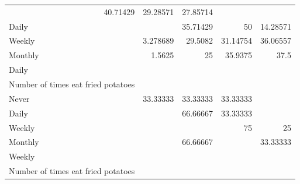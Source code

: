 \documentclass{article}
\begin{document}
\begin{table}[!h]
{\begin{tabular}{lllll}
			\multicolumn{1}{r}{40.71429} &
			\multicolumn{1}{r}{29.28571} &
			\multicolumn{1}{r}{27.85714} \\
			\multicolumn{1}{l}{\hspace{5em}Daily} &
			\multicolumn{1}{|r}{} &
			\multicolumn{1}{r}{35.71429} &
			\multicolumn{1}{r}{50} &
			\multicolumn{1}{r}{14.28571} \\
			\multicolumn{1}{l}{\hspace{5em}Weekly} &
			\multicolumn{1}{|r}{3.278689} &
			\multicolumn{1}{r}{29.5082} &
			\multicolumn{1}{r}{31.14754} &
			\multicolumn{1}{r}{36.06557} \\
			\multicolumn{1}{l}{\hspace{5em}Monthly} &
			\multicolumn{1}{|r}{1.5625} &
			\multicolumn{1}{r}{25} &
			\multicolumn{1}{r}{35.9375} &
			\multicolumn{1}{r}{37.5} \\
			\multicolumn{1}{l}{\hspace{3em}Daily} &
			\multicolumn{1}{|r}{} &
			\multicolumn{1}{r}{} &
			\multicolumn{1}{r}{} &
			\multicolumn{1}{r}{} \\
			\multicolumn{1}{l}{\hspace{4em}Number of times eat fried potatoes} &
			\multicolumn{1}{|r}{} &
			\multicolumn{1}{r}{} &
			\multicolumn{1}{r}{} &
			\multicolumn{1}{r}{} \\
			\multicolumn{1}{l}{\hspace{5em}Never} &
			\multicolumn{1}{|r}{33.33333} &
			\multicolumn{1}{r}{33.33333} &
			\multicolumn{1}{r}{33.33333} &
			\multicolumn{1}{r}{} \\
			\multicolumn{1}{l}{\hspace{5em}Daily} &
			\multicolumn{1}{|r}{} &
			\multicolumn{1}{r}{66.66667} &
			\multicolumn{1}{r}{33.33333} &
			\multicolumn{1}{r}{} \\
			\multicolumn{1}{l}{\hspace{5em}Weekly} &
			\multicolumn{1}{|r}{} &
			\multicolumn{1}{r}{} &
			\multicolumn{1}{r}{75} &
			\multicolumn{1}{r}{25} \\
			\multicolumn{1}{l}{\hspace{5em}Monthly} &
			\multicolumn{1}{|r}{} &
			\multicolumn{1}{r}{66.66667} &
			\multicolumn{1}{r}{} &
			\multicolumn{1}{r}{33.33333} \\
			\multicolumn{1}{l}{\hspace{3em}Weekly} &
			\multicolumn{1}{|r}{} &
			\multicolumn{1}{r}{} &
			\multicolumn{1}{r}{} &
			\multicolumn{1}{r}{} \\
			\multicolumn{1}{l}{\hspace{4em}Number of times eat fried potatoes} &

\end{tabular}}
\end{table}
\end{document}
